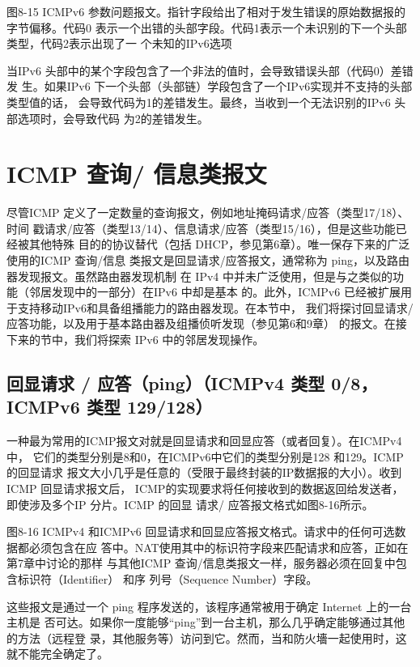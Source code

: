 图8-15 ICMPv6 参数问题报文。指针字段给出了相对于发生错误的原始数据报的字节偏移。代码0
表示一个出错的头部字段。代码1表示一个未识别的下一个头部类型，代码2表示出现了一
个未知的IPv6选项

当IPv6 头部中的某个字段包含了一个非法的值时，会导致错误头部（代码0）差错发
生。如果IPv6 下一个头部（头部链）学段包含了一个IPv6实现并不支持的头部类型值的话，
会导致代码为1的差错发生。最终，当收到一个无法识别的IPv6 头部选项时，会导致代码
为2的差错发生。

\section{ICMP 查询/ 信息类报文}

尽管ICMP 定义了一定数量的查询报文，例如地址掩码请求/应答（类型17/18）、时间
戳请求/应答（类型13/14）、信息请求/应答（类型15/16），但是这些功能已经被其他特殊
目的的协议替代（包括 DHCP，参见第6章）。唯一保存下来的广泛使用的ICMP 查询/信息
类报文是回显请求/应答报文，通常称为 ping，以及路由器发现报文。虽然路由器发现机制
在 IPv4 中并未广泛使用，但是与之类似的功能（邻居发现中的一部分）在IPv6 中却是基本
的。此外，ICMPv6 已经被扩展用于支持移动IPv6和具备组播能力的路由器发现。在本节中，
我们将探讨回显请求/ 应答功能，以及用于基本路由器及组播侦听发现（参见第6和9章）
的报文。在接下来的节中，我们将探索 IPv6 中的邻居发现操作。

\subsection{回显请求 / 应答（ping）（ICMPv4 类型 0/8，ICMPv6 类型 129/128）}
一种最为常用的ICMP报文对就是回显请求和回显应答（或者回复）。在ICMPv4 中，
它们的类型分别是8和0，在ICMPv6中它们的类型分别是128 和129。ICMP 的回显请求
报文大小几乎是任意的（受限于最终封装的IP数据报的大小）。收到ICMP 回显请求报文后，
ICMP的实现要求将任何接收到的数据返回给发送者，即使涉及多个IP 分片。ICMP 的回显
请求/ 应答报文格式如图8-16所示。

图8-16 ICMPv4 和ICMPv6 回显请求和回显应答报文格式。请求中的任何可选数据都必须包含在应
答中。NAT使用其中的标识符字段来匹配请求和应答，正如在第7章中讨论的那样
与其他ICMP 查询/信息类报文一样，服务器必须在回复中包含标识符（Identifier） 和序
列号（Sequence Number）字段。

这些报文是通过一个 ping 程序发送的，该程序通常被用于确定 Internet 上的一台主机是
否可达。如果你一度能够“ping”到一台主机，那么几乎确定能够通过其他的方法（远程登
录，其他服务等）访问到它。然而，当和防火墻一起使用时，这就不能完全确定了。

